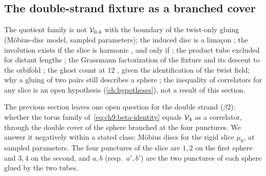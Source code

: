 \subsection{The double-strand fixture as a branched cover}
\label{sec:ws1:cover}

The quotient family is not ${\mathcal{V}}_{0, 4}$ with the boundary of the twist-only gluing  (Möbius-disc model, sampled parameters); the induced disc is a limaçon ; the involution exists if the slice is harmonic , and only if ; the product tube excluded for distant lengths ; the Grassmann factorization of the fixture  and its descent to the orbifold ; the ghost count at $12$ , given the identification of the twist field; why a gluing of two pairs still describes a sphere ; the inequality of correlators for any slice is an open hypothesis (\cref{ch:hypotheses}), not a result of this section.

The previous section leaves one open question for the double strand ($\beta 2$): whether the torus family of~\eqref{eq:ch9:beta-identity} equals $\mathcal{V}_{4}$ as a correlator, through the double cover of the sphere branched at the four punctures.
We answer it negatively within a stated class: Möbius discs for the rigid slice $\mu_0$, at sampled parameters.
The four punctures of the slice are $1, 2$ on the first sphere and $3, 4$ on the second, and $a, b$ (resp.\ $a', b'$) are the two punctures of each sphere glued by the two tubes.

